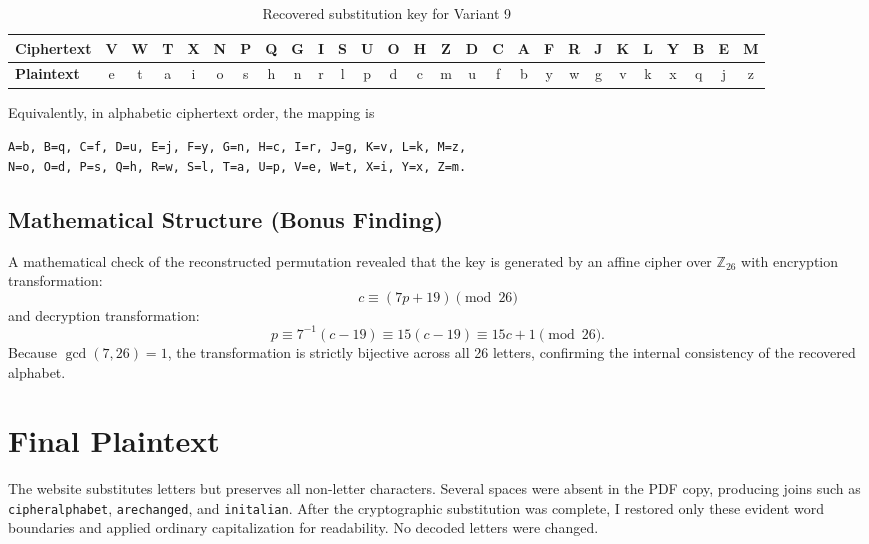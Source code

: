 \documentclass[12pt,a4paper]{article}
\begin{document}
\begin{table}[H]
\centering
\caption{Recovered substitution key for Variant 9}
\label{tab:recovered_key}
\setlength{\tabcolsep}{2.5pt}
\scriptsize
\begin{tabular}{l*{26}{c}}
\toprule
\textbf{Ciphertext} & V & W & T & X & N & P & Q & G & I & S & U & O & H & Z & D & C & A & F & R & J & K & L & Y & B & E & M \\
\midrule
\textbf{Plaintext}  & e & t & a & i & o & s & h & n & r & l & p & d & c & m & u & f & b & y & w & g & v & k & x & q & j & z \\
\bottomrule
\end{tabular}
\end{table}

Equivalently, in alphabetic ciphertext order, the mapping is
\begin{center}
\texttt{A=b, B=q, C=f, D=u, E=j, F=y, G=n, H=c, I=r, J=g, K=v, L=k, M=z,}\\
\texttt{N=o, O=d, P=s, Q=h, R=w, S=l, T=a, U=p, V=e, W=t, X=i, Y=x, Z=m.}
\end{center}

\subsection*{Mathematical Structure (Bonus Finding)}
A mathematical check of the reconstructed permutation revealed that the key is generated by an affine cipher over $\mathbb{Z}_{26}$ with encryption transformation:
\begin{equation}
c \equiv (7p + 19) \pmod{26}
\end{equation}
and decryption transformation:
\begin{equation}
p \equiv 7^{-1}(c - 19) \equiv 15(c - 19) \equiv 15c + 1 \pmod{26}.
\end{equation}
Because $\gcd(7, 26) = 1$, the transformation is strictly bijective across all 26 letters, confirming the internal consistency of the recovered alphabet.

\clearpage

\section{Final Plaintext}
The website substitutes letters but preserves all non-letter characters. Several spaces were absent in the PDF copy, producing joins such as \texttt{cipheralphabet}, \texttt{arechanged}, and \texttt{initalian}. After the cryptographic substitution was complete, I restored only these evident word boundaries and applied ordinary capitalization for readability. No decoded letters were changed.
\end{document}
